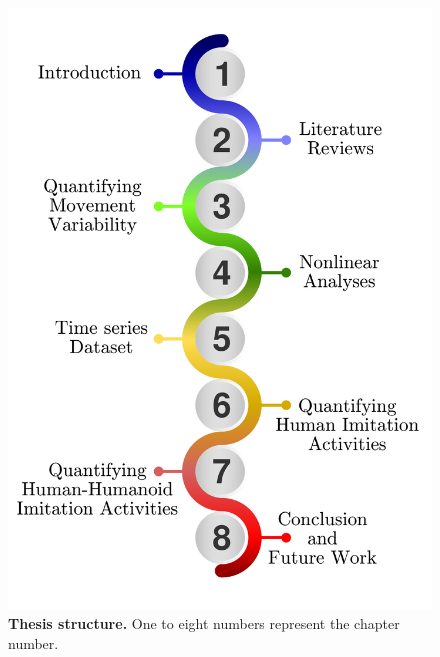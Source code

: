 \begin{figure}
\centering
\includegraphics[width=1.0\textwidth]{thesis-structure-v02}
    \caption{
	{\bf Thesis structure.}
	One to eight numbers represent the chapter number.   
	  }
    \label{fig:ts}
\end{figure}






